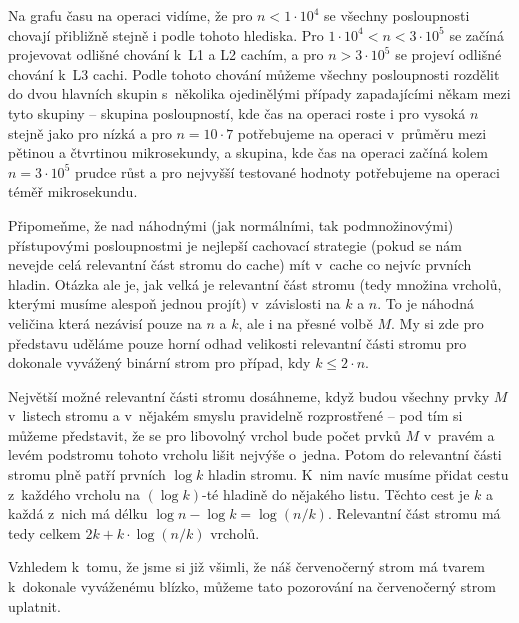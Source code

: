 Na grafu času na operaci vidíme, že pro $n<1\cdot10^4$ se všechny posloupnosti
chovají přibližně stejně i podle tohoto hlediska. Pro $1\cdot10^4 < n < 3\cdot
10^5$ se začíná projevovat odlišné chování k~L1 a L2 cachím, a pro $n > 3\cdot
10^5$ se projeví odlišné chování k~L3 cachi. Podle tohoto chování můžeme
všechny posloupnosti rozdělit do dvou hlavních skupin s~několika ojedinělými
případy zapadajícími někam mezi tyto skupiny -- skupina posloupností, kde čas
na operaci roste i pro vysoká $n$ stejně jako pro nízká a pro $n=10\cdot 7$
potřebujeme na operaci v~průměru mezi pětinou a čtvrtinou mikrosekundy, a
skupina, kde čas na operaci začíná kolem $n=3\cdot 10^5$ prudce růst a pro
nejvyšší testované hodnoty potřebujeme na  
operaci téměř mikrosekundu.

Připomeňme, že nad náhodnými (jak normálními, tak podmnožinovými) přístupovými posloupnostmi je nejlepší cachovací strategie (pokud se nám nevejde celá relevantní část stromu do cache) mít v~cache co nejvíc prvních hladin. Otázka ale je, jak velká je relevantní část stromu (tedy množina vrcholů, kterými musíme alespoň jednou projít) v~závislosti na $k$ a $n$. To je náhodná veličina která nezávisí pouze na $n$ a $k$, ale i na přesné volbě $M$. My si zde pro představu uděláme pouze horní odhad velikosti relevantní části stromu pro dokonale vyvážený binární strom pro případ, kdy $k\leq2\cdot n$. 

Největší možné relevantní části stromu dosáhneme, když budou všechny prvky $M$ v~listech stromu a v~nějakém smyslu pravidelně rozprostřené -- pod tím si můžeme představit, že se pro libovolný vrchol bude počet prvků $M$ v~pravém a levém podstromu tohoto vrcholu lišit nejvýše o~jedna. Potom do relevantní části stromu plně patří prvních $\log k$ hladin stromu. K~nim navíc musíme přidat cestu z~každého vrcholu na $(\log k)$-té hladině do nějakého listu. Těchto cest je $k$ a každá z~nich má délku $\log n - \log k = \log (n/k)$. Relevantní část stromu  má tedy celkem $2k + k\cdot \log (n/k)$ vrcholů.

Vzhledem k~tomu, že jsme si již všimli, že náš červenočerný strom má tvarem k~dokonale vyváženému blízko, můžeme tato pozorování na červenočerný strom uplatnit.

